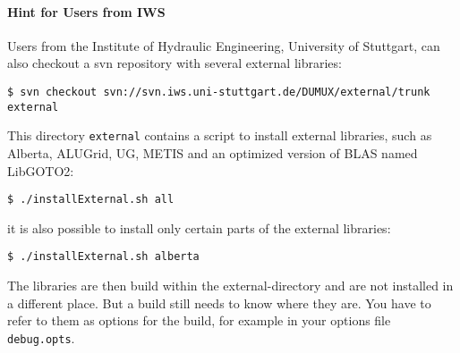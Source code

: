 \paragraph{Hint for Users from IWS} Users from the Institute of Hydraulic Engineering, University of Stuttgart,
can also checkout a svn repository with several external libraries: 

\begin{lstlisting}[style=Bash]
$ svn checkout svn://svn.iws.uni-stuttgart.de/DUMUX/external/trunk external
\end{lstlisting}

This directory \texttt{external} contains a script to install external libraries, such as 
Alberta, ALUGrid, UG, METIS and an optimized version of BLAS named LibGOTO2: 
\begin{lstlisting}[style=Bash]
$ ./installExternal.sh all
\end{lstlisting}
it is also possible to install only certain parts of the external libraries:
\begin{lstlisting}[style=Bash]
$ ./installExternal.sh alberta
\end{lstlisting}

The libraries are then build within the external-directory and are not installed in a different place. 
But a \Dune build still needs to know where they are. You have to refer to them as options for the \Dune build, for example in your options file \texttt{debug.opts}.

